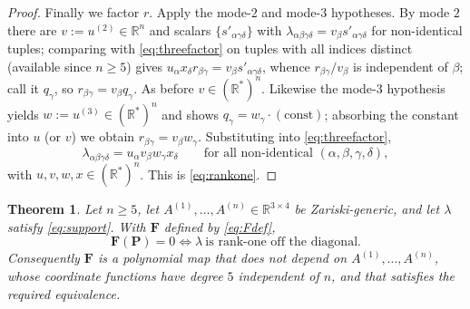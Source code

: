 \documentclass[12pt]{article}
\newcommand{\bR}{\mathbb{R}}
\newtheorem{theorem}{Theorem}
\theoremstyle{definition}
\begin{document}
\begin{proof}
Finally we factor $r$.  Apply the mode-$2$ and mode-$3$ hypotheses.  By mode $2$
there are $v:=u^{(2)}\in\bR^n$ and scalars $\{s'_{\alpha\gamma\delta}\}$ with
$\lambda_{\alpha\beta\gamma\delta}=v_\beta s'_{\alpha\gamma\delta}$ for non-identical
tuples; comparing with \eqref{eq:threefactor} on tuples with all indices distinct
(available since $n\ge5$) gives $u_\alpha x_\delta r_{\beta\gamma}=v_\beta
s'_{\alpha\gamma\delta}$, whence $r_{\beta\gamma}/v_\beta$ is independent of $\beta$;
call it $q_\gamma$, so $r_{\beta\gamma}=v_\beta q_\gamma$.  As before
$v\in(\bR^*)^n$.  Likewise the mode-$3$ hypothesis yields $w:=u^{(3)}\in(\bR^*)^n$
and shows $q_\gamma=w_\gamma\cdot(\text{const})$; absorbing the constant into $u$ (or
$v$) we obtain $r_{\beta\gamma}=v_\beta w_\gamma$.  Substituting into
\eqref{eq:threefactor},
\[
\lambda_{\alpha\beta\gamma\delta}=u_\alpha v_\beta w_\gamma x_\delta
\qquad\text{for all non-identical }(\alpha,\beta,\gamma,\delta),
\]
with $u,v,w,x\in(\bR^*)^n$.  This is \eqref{eq:rankone}.
\end{proof}

\begin{theorem}\label{thm:main}
Let $n\ge5$, let $A^{(1)},\dots,A^{(n)}\in\bR^{3\times4}$ be Zariski-generic, and let
$\lambda$ satisfy \eqref{eq:support}.  With $\mathbf F$ defined by \eqref{eq:Fdef},
\[
\mathbf F(\mathbf P)=0
\iff
\lambda\ \text{is rank-one off the diagonal.}
\]
Consequently $\mathbf F$ is a polynomial map that does not depend on
$A^{(1)},\dots,A^{(n)}$, whose coordinate functions have degree $5$ independent of
$n$, and that satisfies the required equivalence.
\end{theorem}
\end{document}
